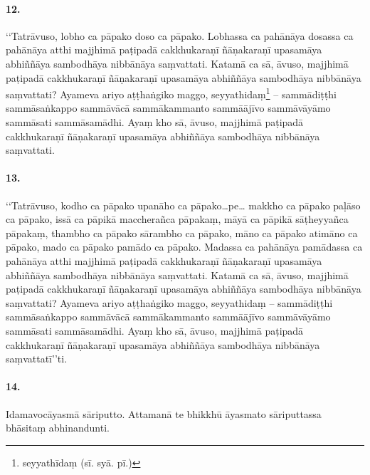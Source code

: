 \paragraph{12.} ‘‘Tatrāvuso, lobho ca pāpako doso ca pāpako. Lobhassa ca pahānāya dosassa ca pahānāya atthi majjhimā paṭipadā cakkhukaraṇī ñāṇakaraṇī upasamāya abhiññāya sambodhāya nibbānāya saṃvattati. Katamā ca sā, āvuso, majjhimā paṭipadā cakkhukaraṇī ñāṇakaraṇī upasamāya abhiññāya sambodhāya nibbānāya saṃvattati? Ayameva ariyo aṭṭhaṅgiko maggo, seyyathidaṃ\footnote{seyyathīdaṃ (sī. syā. pī.)} – sammādiṭṭhi sammāsaṅkappo sammāvācā sammākammanto sammāājīvo sammāvāyāmo sammāsati sammāsamādhi. Ayaṃ kho sā, āvuso, majjhimā paṭipadā cakkhukaraṇī ñāṇakaraṇī upasamāya abhiññāya sambodhāya nibbānāya saṃvattati.

\paragraph{13.} ‘‘Tatrāvuso, kodho ca pāpako upanāho ca pāpako…pe… makkho ca pāpako paḷāso ca pāpako, issā ca pāpikā maccherañca pāpakaṃ, māyā ca pāpikā sāṭheyyañca pāpakaṃ, thambho ca pāpako sārambho ca pāpako, māno ca pāpako atimāno ca pāpako, mado ca pāpako pamādo ca pāpako. Madassa ca pahānāya pamādassa ca pahānāya atthi majjhimā paṭipadā cakkhukaraṇī ñāṇakaraṇī upasamāya abhiññāya sambodhāya nibbānāya saṃvattati. Katamā ca sā, āvuso, majjhimā paṭipadā cakkhukaraṇī ñāṇakaraṇī upasamāya abhiññāya sambodhāya nibbānāya saṃvattati? Ayameva ariyo aṭṭhaṅgiko maggo, seyyathidaṃ – sammādiṭṭhi sammāsaṅkappo sammāvācā sammākammanto sammāājīvo sammāvāyāmo sammāsati sammāsamādhi. Ayaṃ kho sā, āvuso, majjhimā paṭipadā cakkhukaraṇī ñāṇakaraṇī upasamāya abhiññāya sambodhāya nibbānāya saṃvattatī’’ti.

\paragraph{14.} Idamavocāyasmā sāriputto. Attamanā te bhikkhū āyasmato sāriputtassa bhāsitaṃ abhinandunti.

